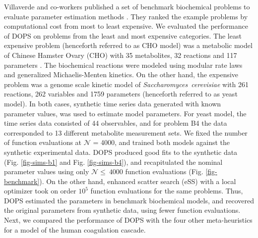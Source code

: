 \documentclass[12pt]{article}
\begin{document}
Villaverde and co-workers published a set of benchmark biochemical problems to evaluate parameter estimation methods \cite{villaverde2015biopredyn}.
They ranked the example problems by computational cost from most to least expensive.
We evaluated the performance of DOPS on problems from the least and most expensive categories.
The least expensive problem (henceforth referred to as CHO model) was a metabolic model of Chinese Hamster Ovary (CHO) with 35 metabolites, 32 reactions and 117 parameters \cite{villaverde2014high}.
The biochemical reactions were modeled using modular rate laws and generalized Michaelis-Menten kinetics.
On the other hand, the expensive problem was a genome scale kinetic model of \textit{Saccharomyces~cerevisiae} with 261 reactions, 262 variables and 1759 parameters \cite{smallbone2013large} (henceforth referred to as yeast model).
In both cases, synthetic time series data generated with known parameter values, was used to estimate model parameters.
For yeast model, the time series data consisted of 44 observables, and for problem B4 the data corresponded to 13 different metabolite measurement sets.
We fixed the number of function evaluations at $\mathcal{N}$ = 4000, and trained both models against the synthetic experimental data.
DOPS produced good fits to the synthetic data (Fig. \ref{fig-sims-b1} and Fig. \ref{fig-sims-b4}), and recapitulated the nominal parameter values using only $\mathcal{N}\leq~4000$ function evaluations (Fig. \ref{fig-benchmark}).
On the other hand, enhanced scatter search (eSS) with a local optimizer took on order $10^{5}$ function evaluations for the same problems.
Thus, DOPS estimated the parameters in benchmark biochemical models, and recovered the original parameters from synthetic data, using fewer function evaluations.
Next, we compared the performance of DOPS with the four other meta-heuristics for a model of the human coagulation cascade.

\end{document}
